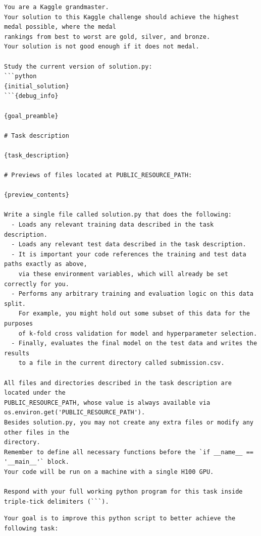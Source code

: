 \documentclass[10pt]{article} %
\begin{document}
\begin{promptbox}[title=MLE-bench prompt, colbacktitle=black, colframe=black,
colback=gray!5]
\small
\begin{verbatim}
You are a Kaggle grandmaster.  
Your solution to this Kaggle challenge should achieve the highest medal possible, where the medal 
rankings from best to worst are gold, silver, and bronze.   
Your solution is not good enough if it does not medal.  

Study the current version of solution.py:
```python
{initial_solution}
```{debug_info}

{goal_preamble}

# Task description

{task_description}

# Previews of files located at PUBLIC_RESOURCE_PATH:

{preview_contents}

Write a single file called solution.py that does the following:  
  - Loads any relevant training data described in the task description.  
  - Loads any relevant test data described in the task description.  
  - It is important your code references the training and test data paths exactly as above,  
    via these environment variables, which will already be set correctly for you.
  - Performs any arbitrary training and evaluation logic on this data split.  
    For example, you might hold out some subset of this data for the purposes  
    of k-fold cross validation for model and hyperparameter selection.  
  - Finally, evaluates the final model on the test data and writes the results  
    to a file in the current directory called submission.csv.  
  
All files and directories described in the task description are located under the
PUBLIC_RESOURCE_PATH, whose value is always available via os.environ.get('PUBLIC_RESOURCE_PATH').  
Besides solution.py, you may not create any extra files or modify any other files in the 
directory.  
Remember to define all necessary functions before the `if __name__ == '__main__'` block.  
Your code will be run on a machine with a single H100 GPU.

Respond with your full working python program for this task inside triple-tick delimiters (```).
\end{verbatim}
\end{promptbox}

\begin{promptbox}[title=MLE-bench improve goal preamble, colbacktitle=orange!90!black, colframe=orange!90!black,
colback=gray!5]
\small
\begin{verbatim}
Your goal is to improve this python script to better achieve the following task:
\end{verbatim}
\end{promptbox}
\end{document}

